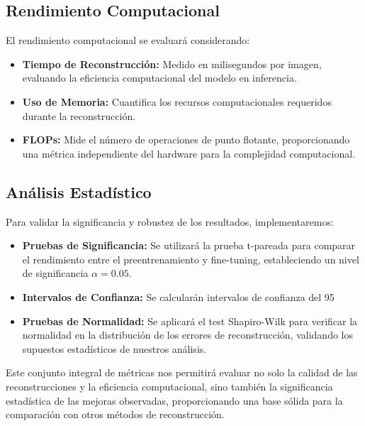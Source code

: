 \subsection{Rendimiento Computacional}
El rendimiento computacional se evaluará considerando:

\begin{itemize}
    \item \textbf{Tiempo de Reconstrucción:} Medido en milisegundos por imagen, evaluando la eficiencia computacional del modelo en inferencia.
    
    \item \textbf{Uso de Memoria:} Cuantifica los recursos computacionales requeridos durante la reconstrucción.
    
    \item \textbf{FLOPs:} Mide el número de operaciones de punto flotante, proporcionando una métrica independiente del hardware para la complejidad computacional.
\end{itemize}

\subsection{Análisis Estadístico}
Para validar la significancia y robustez de los resultados, implementaremos:

\begin{itemize}
    \item \textbf{Pruebas de Significancia:} Se utilizará la prueba t-pareada para comparar el rendimiento entre el preentrenamiento y fine-tuning, estableciendo un nivel de significancia $\alpha = 0.05$.
    
    \item \textbf{Intervalos de Confianza:} Se calcularán intervalos de confianza del 95%
    
    \item \textbf{Pruebas de Normalidad:} Se aplicará el test Shapiro-Wilk para verificar la normalidad en la distribución de los errores de reconstrucción, validando los supuestos estadísticos de nuestros análisis.
\end{itemize}

Este conjunto integral de métricas nos permitirá evaluar no solo la calidad de las reconstrucciones y la eficiencia computacional, sino también la significancia estadística de las mejoras observadas, proporcionando una base sólida para la comparación con otros métodos de reconstrucción.